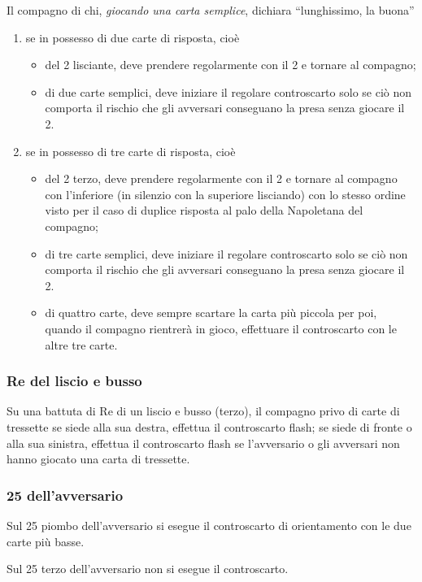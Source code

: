 \documentclass[italian,a4paper]{article}
\newenvironment{packeditem}{
\begin{itemize}
  \setlength{\itemsep}{1pt}
  \setlength{\parskip}{0pt}
  \setlength{\parsep}{0pt}
}{\end{itemize}}
\newenvironment{packedenum}{
\begin{enumerate}
  \setlength{\itemsep}{1pt}
  \setlength{\parskip}{0pt}
  \setlength{\parsep}{0pt}
}{\end{enumerate}}
\begin{document}
Il compagno di chi, \emph{giocando una carta semplice}, dichiara ``lunghissimo, la buona''
\begin{packedenum}
    \item se in possesso di due carte di risposta, cioè
        \begin{packeditem}
        \item del 2 lisciante, deve prendere regolarmente con il 2 e tornare al compagno;
        \item di due carte semplici, deve iniziare il regolare controscarto solo se ciò non comporta il rischio che gli avversari conseguano la presa senza giocare il 2.
        \end{packeditem}
    \item se in possesso di tre carte di risposta, cioè
        \begin{packeditem}
        \item del 2 terzo, deve prendere regolarmente con il 2 e tornare al compagno con l'inferiore (in silenzio con la superiore lisciando) con lo stesso ordine visto per il caso di duplice risposta al palo della Napoletana del compagno;
        \item di tre carte semplici, deve iniziare il regolare controscarto solo se ciò non comporta il rischio che gli avversari conseguano la presa senza giocare il 2.
        \item di quattro carte, deve sempre scartare la carta più piccola per poi, quando il compagno rientrerà in gioco, effettuare il controscarto con le altre tre carte.
        \end{packeditem}
\end{packedenum}
\subsubsection{Re del liscio e busso}
Su una battuta di Re di un liscio e busso (terzo), il compagno privo di carte di tressette se siede alla sua destra, effettua il controscarto flash; se siede di fronte o alla sua sinistra, effettua il controscarto flash se l'avversario o gli avversari non hanno giocato una carta di tressette.
\subsubsection{25 dell'avversario}
Sul 25 piombo dell'avversario si esegue il controscarto di orientamento con le due carte più basse.
 
Sul 25 terzo dell'avversario non si esegue il controscarto.
 
\end{document}
